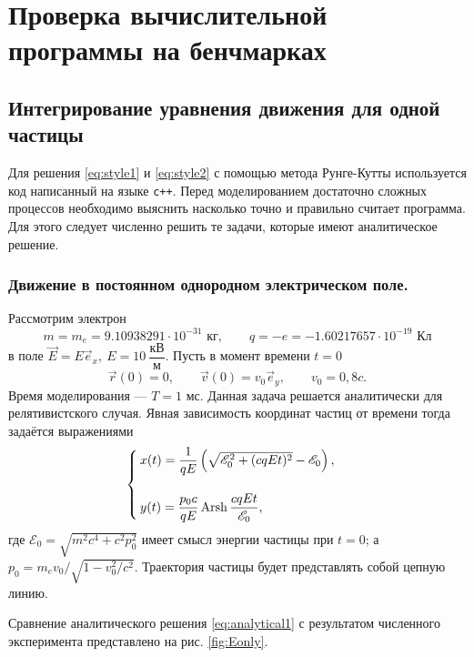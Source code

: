 \chapter{Проверка вычислительной программы на бенчмарках} \label{AppendixC}

\section{Интегрирование уравнения движения для одной частицы}

Для решения \eqref{eq:style1} и \eqref{eq:style2} с помощью метода Рунге-Кутты используется код написанный на языке \texttt{c++}.
Перед моделированием достаточно сложных процессов необходимо выяснить насколько точно и правильно считает программа.
Для этого следует численно решить те задачи, которые имеют аналитическое решение.

\subsection{Движение в постоянном однородном электрическом поле.}

Рассмотрим электрон
\begin{equation*}
m = m_e = 9.10938291 \cdot 10^{-31} \text{ кг}, \qquad q = -e = - 1.60217657 \cdot 10^{-19} \text{ Кл}
\end{equation*}
 в поле
$
\vec{E} = E \vec{e}_x
,\ 
E = 10\ \dfrac{\text{кВ}}{\text{м}}$. Пусть в момент времени $t=0$
\begin{equation*}
\vec{r}(0) = 0, \qquad \vec{v}(0) = v_0 \vec{e}_y, \qquad v_0 = 0,8c.
\end{equation*}
Время моделирования --- $T = 1 \text{ мс}$. Данная задача решается аналитически для релятивистского случая. Явная зависимость координат частиц от времени тогда задаётся выражениями
\begin{equation}
	\begin{cases}
		x(t) = \dfrac{1}{qE} \left(\sqrt{\mathscr{E}_0^2 + (cqEt)^2 } - \mathscr{E}_0 \right),  \\ \\
		y(t) = \dfrac{p_0c}{qE} \operatorname{Arsh} \dfrac{cqEt}{\mathscr{E}_0},
	\end{cases}
	\label{eq:analytical1}
\end{equation}
где $\mathscr{E}_0  = \sqrt{m^2c^4 + c^2 p_0^2}$ имеет смысл энергии частицы при $t = 0$; а $p_0 = m_e v_0 / \sqrt{1 - v^2_0/c^2}$.
Траектория частицы будет представлять собой цепную линию.


Сравнение аналитического решения \eqref{eq:analytical1} с результатом численного эксперимента представлено на рис. \ref{fig:Eonly}.

